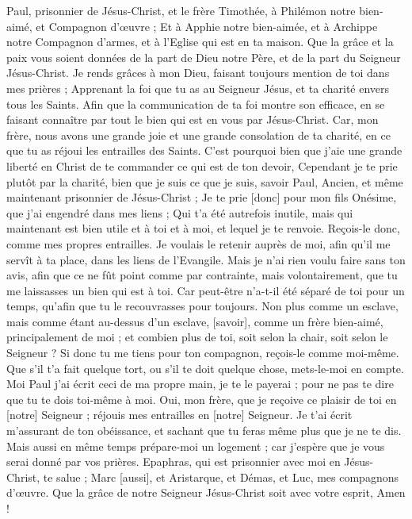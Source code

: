 \BFont
\begin{multicols}{2}
\VerseOne{}Paul, prisonnier de Jésus-Christ, et le frère Timothée, à Philémon notre bien-aimé, et Compagnon d'œuvre ;
Et à Apphie notre bien-aimée, et à Archippe notre Compagnon d'armes, et à l'Eglise qui est en ta maison.
Que la grâce et la paix vous soient données de la part de Dieu notre Père, et de la part du Seigneur Jésus-Christ.
Je rends grâces à mon Dieu, faisant toujours mention de toi dans mes prières ;
Apprenant la foi que tu as au Seigneur Jésus, et ta charité envers tous les Saints.
Afin que la communication de ta foi montre son efficace, en se faisant connaître par tout le bien qui est en vous par Jésus-Christ.
Car, mon frère, nous avons une grande joie et une grande consolation de ta charité, en ce que tu as réjoui les entrailles des Saints.
C'est pourquoi bien que j'aie une grande liberté en Christ de te commander ce qui est de ton devoir,
Cependant je te prie plutôt par la charité, bien que je suis ce que je suis, savoir Paul, Ancien, et même maintenant prisonnier de Jésus-Christ ;
Je te prie [donc] pour mon fils Onésime, que j'ai engendré dans mes liens ;
Qui t'a été autrefois inutile, mais qui maintenant est bien utile et à toi et à moi, et lequel je te renvoie.
Reçois-le donc, comme mes propres entrailles.
Je voulais le retenir auprès de moi, afin qu'il me servît à ta place, dans les liens de l'Evangile.
Mais je n'ai rien voulu faire sans ton avis, afin que ce ne fût point comme par contrainte, mais volontairement, que tu me laissasses un bien qui est à toi.
Car peut-être n'a-t-il été séparé de toi pour un temps, qu'afin que tu le recouvrasses pour toujours.
Non plus comme un esclave, mais comme étant au-dessus d'un esclave, [savoir], comme un frère bien-aimé, principalement de moi ; et combien plus de toi, soit selon la chair, soit selon le Seigneur ?
Si donc tu me tiens pour ton compagnon, reçois-le comme moi-même.
Que s'il t'a fait quelque tort, ou s'il te doit quelque chose, mets-le-moi en compte.
Moi Paul j'ai écrit ceci de ma propre main, je te le payerai ; pour ne pas te dire que tu te dois toi-même à moi.
Oui, mon frère, que je reçoive ce plaisir de toi en [notre] Seigneur ; réjouis mes entrailles en [notre] Seigneur.
Je t'ai écrit m'assurant de ton obéissance, et sachant que tu feras même plus que je ne te dis.
Mais aussi en même temps prépare-moi un logement ; car j'espère que je vous serai donné par vos prières.
Epaphras, qui est prisonnier avec moi en Jésus-Christ, te salue ;
Marc [aussi], et Aristarque, et Démas, et Luc, mes compagnons d'œuvre.
Que la grâce de notre Seigneur Jésus-Christ soit avec votre esprit, Amen !
\PPE{}
\end{multicols}
